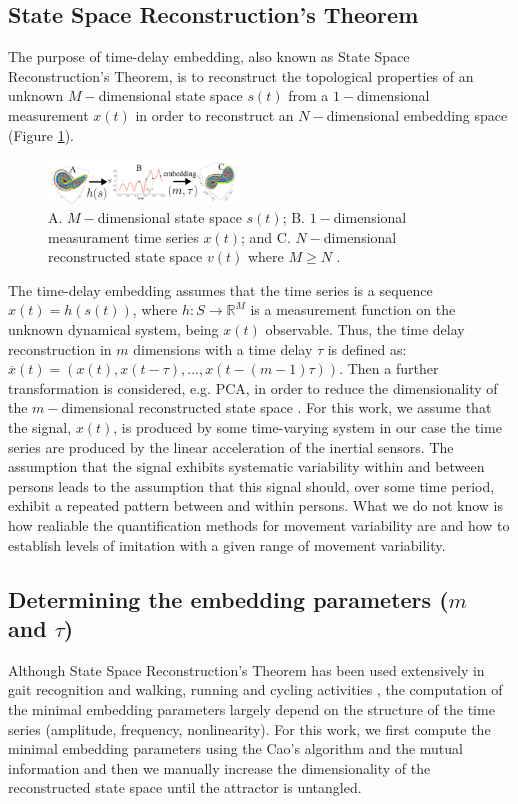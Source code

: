 \documentclass{sigchi}
\begin{document}
\subsection{State Space Reconstruction's Theorem}
The purpose of time-delay embedding, also known as State Space Reconstruction's
Theorem, is to reconstruct the topological properties of an unknown $M-$dimensional
state space $s(t)$ from a $1-$dimensional measurement $x(t)$ in order to
reconstruct an $N-$dimensional embedding space (Figure \ref{fig:takens_theorem}).
\begin{figure}[!htb]
\centering
\includegraphics[width=0.45\textwidth]{figures/reconstructed_state_space/fig}
\caption[PA]{A. $M-$dimensional state space $s(t)$; B. $1-$dimensional measurament
time series $x(t)$; and  C. $N-$dimensional reconstructed state space $v(t)$ where $M \geq N$
\cite{QuintanaDuque2012}.}
\label{fig:takens_theorem}
\end{figure}
The time-delay embedding assumes that the time series is a sequence $x(t)=h(s(t))$,
where $h: S \rightarrow \mathbb{R}^M$ is a measurement function on the unknown
dynamical system, being $x(t)$ observable.
Thus, the time delay reconstruction in $m$ dimensions with a time delay
$\tau$ is defined as: $\overline{x}(t) = (x(t), x(t-\tau),...,x(t-(m-1)\tau))$.
Then a further transformation is considered, e.g. PCA, in order to reduce
the dimensionality of the $m-$dimensional reconstructed state space \cite{Uzal2011}.
For this work, we assume that the signal, $x(t)$, is produced by some time-varying
system in our case the time series are produced by the linear acceleration of
the inertial sensors.
The assumption that the signal exhibits systematic variability within and between
persons leads to the assumption that this signal should, over some time period,
exhibit a repeated pattern between and within persons. What we do not know is
how realiable the quantification methods for movement variability are and how
to establish levels of imitation with a given range of movement variability.


\subsection{Determining the embedding parameters ($m$ and $\tau$)}
Although State Space Reconstruction's Theorem has been used extensively in gait
recognition and walking, running and cycling activities \cite{Frank2010,Sama2013},
the computation of the minimal embedding parameters largely depend on the
structure of the time series (amplitude, frequency, nonlinearity).
For this work, we first compute the minimal embedding parameters
using the Cao's algorithm \cite{Cao1997} and the mutual information
and then we manually increase the dimensionality of the reconstructed state
space until the attractor is untangled.
\end{document}
